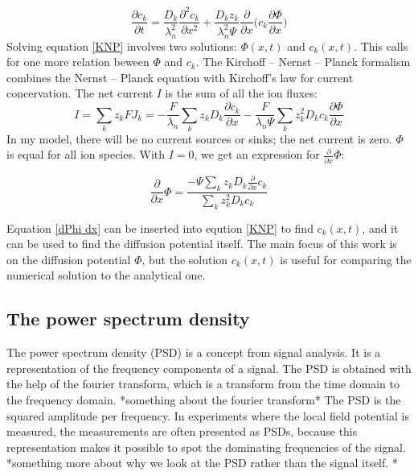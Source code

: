 \documentclass{article}
\begin{document}
\begin{equation}\label{KNP}
\frac{\partial c_k}{\partial t}= \frac{D_k}{\lambda_n^2} \frac{\partial^2 c_k}{\partial x^2}+\frac{D_k z_k}{\lambda_n^2 \Psi} \frac{\partial }{\partial x}  \bigg(c_k \frac{\partial \Phi}{\partial x} \bigg)
\end{equation}
Solving equation \ref{KNP} involves two solutions: $\Phi (x,t)$ and $c_k(x,t)$. This calls for one more relation beween $\Phi$ and $c_k$. The Kirchoff -- Nernst -- Planck formalism combines the Nernst -- Planck equation with Kirchoff's law for current concervation. 
The net current $I$ is the sum of all the ion fluxes:
\begin{equation}
I = \sum_{k}z_k FJ_k = -\frac{F}{\lambda_n}\sum_k z_k D_k  \frac{\partial c_k}{ \partial x} - \frac{F}{\lambda_n \Psi}\sum_k z_k^2D_k c_k \frac{\partial \Phi}{\partial x}
\end{equation}
In my model, there will be no current sources or sinks; the net current is zero. 
$\Phi$ is equal for all ion species. With $I =0$, we get an expression for $ \frac{\partial}{\partial x} \Phi$:

\begin{equation}\label{dPhi dx}
\frac{\partial}{\partial x} \Phi = \frac{-\Psi \sum_k z_k D_k \frac{\partial}{\partial x} c_k}{\sum_k z_k^2 D_k c_k}
\end{equation}

Equation \ref{dPhi dx} can be inserted into eqution \ref{KNP} to find $c_k(x,t)$, and it can be used to find the diffusion potential itself. The main focus of this work is on the diffusion potential $\Phi$, but the solution $c_k(x,t)$ is useful for comparing the numerical solution to the analytical one.

\subsection{The power spectrum density}
The power spectrum density (PSD) is a concept from signal analysis. It is a representation of the frequency components of a signal. The PSD is obtained with the help of the fourier transform, which is a transform from the time domain to the frequency domain. *something about the fourier transform* The PSD is the squared amplitude per frequency. In experiments where the local field potential is measured, the measurements are often presented as PSDs, because this representation makes it possible to spot the dominating frequencies of the signal. *something more about why we look at the PSD rather than the signal itself. *
\end{document}
